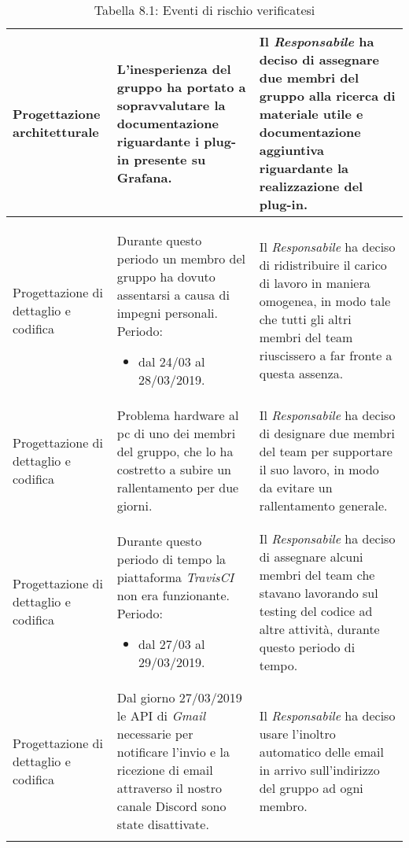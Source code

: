 \begin{longtable}{| L{7em} | L{15em} | L{16em} |}
Progettazione architetturale & L'inesperienza del gruppo ha portato a sopravvalutare la documentazione riguardante i plug-in presente su Grafana. & Il \emph{Responsabile} ha deciso di assegnare due membri del gruppo alla ricerca di materiale utile e documentazione aggiuntiva riguardante la realizzazione del plug-in. \\
\hline

Progettazione di dettaglio e codifica & Durante questo periodo un membro del gruppo ha dovuto assentarsi a causa di impegni personali. Periodo:\begin{itemize}
	\item dal 24/03 al 28/03/2019.
\end{itemize} & Il \emph{Responsabile} ha deciso di ridistribuire il carico di lavoro in maniera omogenea, in modo tale che tutti gli altri membri del team riuscissero a far fronte a questa assenza. \\
\hline

Progettazione di dettaglio e codifica & Problema hardware al pc di uno dei membri del gruppo, che lo ha costretto a subire un rallentamento per due giorni. & Il \emph{Responsabile} ha deciso di designare due membri del team per supportare il suo lavoro, in modo da evitare un rallentamento generale. \\
\hline

Progettazione di dettaglio e codifica & Durante questo periodo di tempo la piattaforma \emph{TravisCI} non era funzionante. Periodo:\begin{itemize}
	\item dal 27/03 al 29/03/2019.
\end{itemize} & Il \emph{Responsabile} ha deciso di assegnare alcuni membri del team che stavano lavorando sul testing del codice ad altre attività, durante questo periodo di tempo. \\
\hline

Progettazione di dettaglio e codifica & Dal giorno 27/03/2019 le API di \emph{Gmail} necessarie per notificare l'invio e la ricezione di email attraverso il nostro canale Discord sono state disattivate. & Il \emph{Responsabile} ha deciso usare l'inoltro automatico delle email in arrivo sull'indirizzo del gruppo ad ogni membro. \\
\hline
\caption{Tabella 8.1: Eventi di rischio verificatesi\label{}}
\end{longtable}
\renewcommand{\arraystretch}{1}
\newpage

